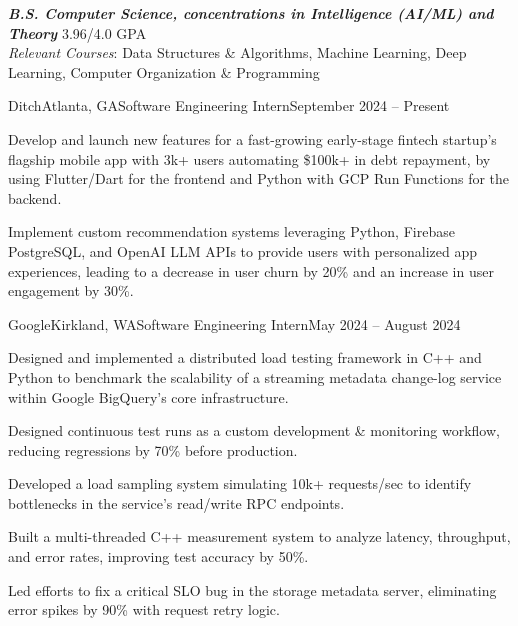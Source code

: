 \documentclass{article}
\begin{document}
\thispagestyle{empty}


\begin{flushleft}


{\textbf{\textit{B.S. Computer Science, concentrations in Intelligence (AI/ML) and Theory}} \hfill 3.96/4.0 GPA \\ \textit{Relevant Courses}:
    Data Structures \& Algorithms,
    Machine Learning,
    Deep Learning,
    Computer Organization \& Programming
    \\
}


    \begin{experience}{Ditch}{Atlanta, GA}{Software Engineering Intern}{September 2024 -- Present}
        \item Develop and launch new features for a fast-growing early-stage fintech startup's flagship mobile app with 3k+ users automating \$100k+ in debt repayment, by using Flutter/Dart for the frontend and Python with GCP Run Functions for the backend.
        \item Implement custom recommendation systems leveraging Python, Firebase PostgreSQL, and OpenAI LLM APIs to provide users with personalized app experiences, leading to a decrease in user churn by 20\% and an increase in user engagement by 30\%.
    \end{experience}

    \begin{experience}{Google}{Kirkland, WA}{Software Engineering Intern}{May 2024 -- August 2024}
        \item Designed and implemented a distributed load testing framework in C++ and Python to benchmark the scalability of a streaming metadata change-log service within Google BigQuery's core infrastructure.
        \item Designed continuous test runs as a custom development \& monitoring workflow, reducing regressions by 70\% before production.
        \item Developed a load sampling system simulating 10k+ requests/sec to identify bottlenecks in the service's read/write RPC endpoints.
        \item Built a multi-threaded C++ measurement system to analyze latency, throughput, and error rates, improving test accuracy by 50\%.
        \item Led efforts to fix a critical SLO bug in the storage metadata server, eliminating error spikes by 90\% with request retry logic.
    \end{experience}


\end{flushleft}
\end{document}
